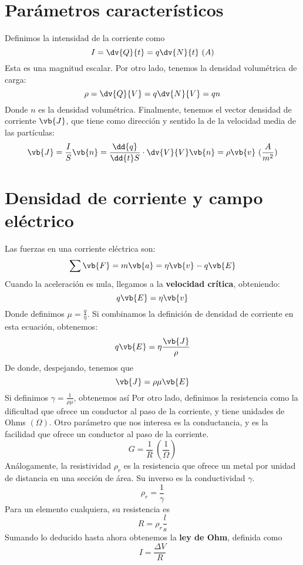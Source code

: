 \documentclass{./FisicaII.tex}
\begin{document}
\section{Parámetros característicos}
Definimos la intensidad de la corriente como
\[
	I = \dv{Q}{t} = q\dv{N}{t}~(A)
\]
Esta es una magnitud escalar. Por otro lado, tenemos la densidad volumétrica de carga:
\[
	\rho = \dv{Q}{V} = q\dv{N}{V} = qn
\]
Donde $n$ es la densidad volumétrica. Finalmente, tenemos el vector densidad de corriente $\vb{J}$, que tiene como dirección y sentido la de la velocidad media de las partículas:
\[
	\vb{J} = \frac{I}{S}\vb{n} = \frac{\dd{q}}{\dd{t}S}\cdot \dv{V}{V} \vb{n} = \rho \vb{v}~(\frac{A}{m ^{2}})
\]
\section{Densidad de corriente y campo eléctrico}
Las fuerzas en una corriente eléctrica son:
\[
	\sum \vb{F} = m \vb{a} = \eta \vb{v} -q \vb{E}
\]
Cuando la aceleración es nula, llegamos a la \textbf{velocidad crítica}, obteniendo:
\[
	q \vb{E} = \eta \vb{v}
\]
Donde definimos $\mu = \frac{q}{\eta}$. Si combinamos la definición de densidad de corriente en esta ecuación, obtenemos:
\[
	q \vb{E} = \eta \frac{\vb{J}}{\rho}
\]
De donde, despejando, tenemos que
\[
	\vb{J} = \rho \mu \vb{E}
\]
Si definimos $\gamma = \frac{1}{\rho \mu}$, obtenemos así 
Por otro lado, definimos la resistencia como la dificultad que ofrece un conductor al paso de la corriente, y tiene unidades de Ohms $(\Omega)$. Otro parámetro que nos interesa es la conductancia, y es la facilidad que ofrece un conductor al paso de la corriente. 
\[
	G = \frac{1}{R} ~(\frac{1}{\Omega})
\]
Análogamente, la resistividad $\rho_{r}$ es la resistencia que ofrece un metal por unidad de distancia en una sección de área. Su inverso es la conductividad $\gamma$.  
\[
	\rho_{r} = \frac{1}{\gamma}
\]
Para un elemento cualquiera, su resistencia es
\[
	\boxed{
		R = \rho_{r} \frac{l}{s}
	}
\]
Sumando lo deducido hasta ahora obtenemos la \textbf{ley de Ohm}, definida como
\[
	I = \frac{\Delta V}{R}
\]
\end{document}
